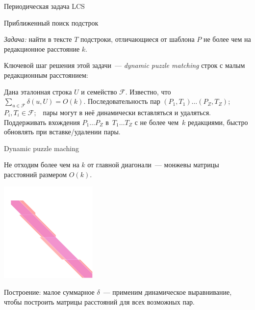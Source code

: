\documentclass[svgnames]{beamer}
\begin{document}
\begin{frame}{Периодическая задача LCS}
\end{frame}


\begin{frame}{Приближенный поиск подстрок}

\begin{block}{\vspace*{-3ex}}
  {\it Задача:} найти в тексте \(T\) подстроки, отличающиеся от шаблона \(P\) не более чем на редакционное расстояние \(k\).
\end{block} \vspace{4mm}

Ключевой шаг решения этой задачи~— {\it dynamic puzzle matching} строк с малым редакционным расстоянием:

\begin{block}{\vspace*{-3ex}}
  Дана эталонная строка \(U\) и семейство \(\mathcal F\).
  Известно, что \(\sum_{u \in \mathcal F} \delta (u, U) = O(k)\).
  Последовательность пар \((P_1, T_1) \ldots (P_Z, T_Z)\);\ \ 
  \(P_i, T_i \in \mathcal F\);\ \ пары могут в неё динамически
  вставляться и удаляться. Поддерживать вхождения
  \(P_1 \ldots P_Z\) в~\(T_1 \ldots T_Z\) с не более
  чем~\(k\) редакциями, быстро обновлять при вставке/удалении пары.
\end{block} \vspace{8mm}

\end{frame}


\begin{frame}{Dynamic puzzle maching}

Не отходим более чем на \(k\) от главной диагонали~— монжевы матрицы расстояний размером \(O(k)\).

\begin{center}
  \includegraphics[width=4.8cm]{svg/wellnitz}
\end{center}

Построение: малое суммарное \(\delta\)~— применим динамическое выравнивание, чтобы построить матрицы расстояний для всех возможных пар.

\end{frame}
\end{document}
